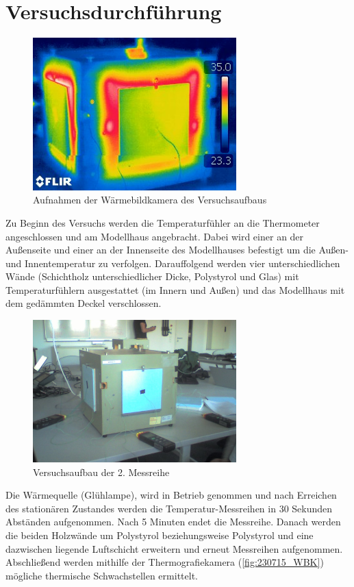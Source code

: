 \section{Versuchsdurchführung}

\begin{figure}[H]
    \centering
    \includegraphics[width=0.7\textwidth]{Abbildungen/WBK_UWERT.jpg}
    \caption{Aufnahmen der Wärmebildkamera des Versuchsaufbaus}
    \label{fig:230715_WBK}
\end{figure}

Zu Beginn des Versuchs werden die Temperaturfühler an die Thermometer angeschlossen und am Modellhaus angebracht. Dabei wird einer an der Außenseite und einer an der Innenseite des Modellhauses befestigt 
um die Außen- und Innentemperatur zu verfolgen. Darauffolgend werden vier unterschiedlichen Wände (Schichtholz unterschiedlicher Dicke, Polystyrol und Glas) mit Temperaturfühlern ausgestattet (im Innern und Außen) und 
das Modellhaus mit dem gedämmten Deckel verschlossen.

\begin{figure}[H]
    \centering
    \includegraphics[width=0.7\textwidth]{Abbildungen/M2_Modellhaus.jpeg}
    \caption{Versuchsaufbau der 2. Messreihe}
    \label{fig:230715_M2}
\end{figure}

Die Wärmequelle (Glühlampe), wird in Betrieb genommen und nach Erreichen des stationären Zustandes werden die Temperatur-Messreihen in 30 Sekunden Abständen aufgenommen. Nach 5 Minuten endet die Messreihe.
 Danach werden die beiden Holzwände um Polystyrol beziehungsweise Polystyrol und eine dazwischen liegende Luftschicht erweitern und erneut Messreihen aufgenommen. 
Abschließend werden mithilfe der Thermografiekamera (\autoref{fig:230715_WBK}) mögliche thermische Schwachstellen ermittelt.